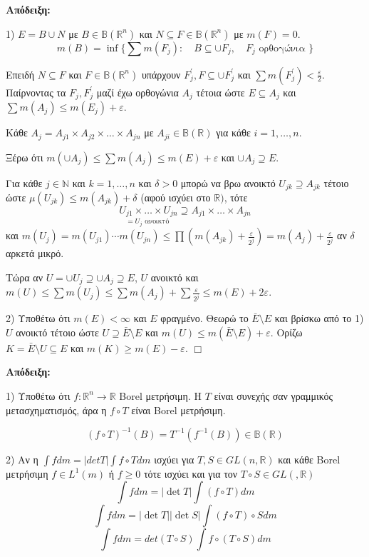 \textbf{Απόδειξη:} $ $

    1) $E = B \cup N$ με $B \in \mathbb B ( \mathbb R^n )$ και $N \subseteq F \in \mathbb B (\mathbb R^n)$ με $m(F) = 0$.
    $$m(B) = \inf \{ \sum m(F_j): \quad B \subseteq \cup F_j, \quad F_j \textrm{ ορθογώνια }\}$$

    
    Επειδή $N\subseteq F$ και $F \in \mathbb B (\mathbb R^n)$ υπάρχουν $F^{\prime}_j, F \subseteq \cup F^{\prime}_j$ και $\sum m(F^{\prime}_j) < \frac{\varepsilon}{2}$. Παίρνοντας τα $F_j, F^{\prime}_j$ μαζί έχω ορθογώνια $A_j$ τέτοια ώστε $E \subseteq A_j$ και $\sum m(A_j) \leq m(E_j) + \varepsilon$.

    
    Κάθε $A_j = A_{j1} \times A_{j2} \times \ldots \times A_{jn}$ με $A_{ji} \in \mathbb B(\mathbb R)$ για κάθε $i=1,\ldots,n$.

    
    Ξέρω ότι $m(\cup A_j) \leq \sum m(A_j) \leq m(E) + \varepsilon$ και $\cup A_j \supseteq E$.

    
    Για κάθε $j \in \mathbb N$ και $k=1,\ldots,n$ και $\delta >0$ μπορώ να βρω ανοικτό $U_{jk} \supseteq A_{jk}$ τέτοιο ώστε $μ(U_{jk}) \leq m(A_{jk}) + \delta$ (αφού ισχύει στο $\mathbb{R})$, τότε 
    $$\underset{=U_j \textrm{ ανοικτό }}{ U_{j1} \times \ldots \times U_{jn}} \supseteq A_{j1} \times \ldots \times A_{jn}$$ και $m(U_j) = m(U_{j1})\cdots m(U_{jn}) \leq \prod \left( m(A_{jk}) + \frac{\varepsilon}{2^j}\right) = m(A_j) + \frac{\varepsilon}{2^j}$ αν $\delta$ αρκετά μικρό.

    
    Τώρα αν $U = \cup U_j \supseteq \cup A_j \supseteq E$, $U$ ανοικτό και $m(U) \leq \sum m(U_j) \leq \sum m(A_j) + \sum\frac{\varepsilon}{2^j} \leq m(E) + 2\varepsilon$.


    
    2) Υποθέτω ότι $m(E) <\infty$ και $E$ φραγμένο. Θεωρώ το $\bar E\setminus E$ και βρίσκω από το 1) $U$ ανοικτό τέτοιο ώστε $U \supseteq \bar{E}\setminus E$ και $m(U) \leq m(\bar{E}\setminus E) + \varepsilon$. Ορίζω $K = \bar{E}\setminus U \subseteq E$ και $m(K) \geq m(E)-\varepsilon$.
\hfill $\Box$

\textbf{Απόδειξη:} $ $

    
    1) Υποθέτω ότι $f: \mathbb R^n \rightarrow \mathbb R$ Borel μετρήσιμη. Η $T$ είναι συνεχής σαν γραμμικός μετασχηματισμός, άρα η $f\circ T$ είναι Borel μετρήσιμη.

    $$(f\circ T)^{-1}(B) = T^{-1}\left( f^{-1}(B)\right) \in \mathbb B (\mathbb{R})$$
    
    
    2) Αν η $\int f dm = |detT| \int f\circ T dm$ ισχύει για $T,S \in GL(n,\mathbb R)$ και κάθε Borel μετρήσιμη $f \in L^1 (m)$ ή $f\geq 0$ τότε ισχύει και για τον $T\circ S \in GL(,\mathbb R)$
    $$\int f dm = |\det T| \int (f\circ T) dm$$
    $$\int f dm = |\det T||\det S| \int (f\circ T) \circ S dm$$
    $$\int f dm = det(T\circ S) \int f\circ(T\circ S)dm$$

